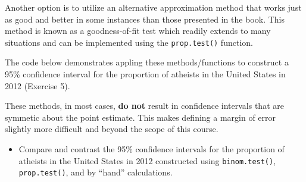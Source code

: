 \documentclass[]{book}
\newenvironment{Shaded}{\begin{snugshade}}{\end{snugshade}}
\newcommand{\KeywordTok}[1]{\textcolor[rgb]{0.13,0.29,0.53}{\textbf{#1}}}
\newcommand{\DataTypeTok}[1]{\textcolor[rgb]{0.13,0.29,0.53}{#1}}
\newcommand{\StringTok}[1]{\textcolor[rgb]{0.31,0.60,0.02}{#1}}
\newcommand{\CommentTok}[1]{\textcolor[rgb]{0.56,0.35,0.01}{\textit{#1}}}
\newcommand{\OperatorTok}[1]{\textcolor[rgb]{0.81,0.36,0.00}{\textbf{#1}}}
\newcommand{\NormalTok}[1]{#1}
\providecommand{\tightlist}{%
  \setlength{\itemsep}{0pt}\setlength{\parskip}{0pt}}
\theoremstyle{definition}
\theoremstyle{definition}
\theoremstyle{definition}
\theoremstyle{remark}
\begin{document}
Another option is to utilize an alternative approximation method that
works just as good and better in some instances than those presented in
the book. This method is known as a goodness-of-fit test which readily
extends to many situations and can be implemented using the
\texttt{prop.test()} function.

The code below demonstrates appling these methods/functions to construct
a 95\% confidence interval for the proportion of atheists in the United
States in 2012 (Exercise 5).

\begin{Shaded}
\end{Shaded}

These methods, in most cases, \textbf{do not} result in confidence
intervals that are symmetic about the point estimate. This makes
defining a margin of error slightly more difficult and beyond the scope
of this course.

\begin{itemize}
\tightlist
\item
  Compare and contrast the 95\% confidence intervals for the proportion
  of atheists in the United States in 2012 constructed using
  \texttt{binom.test()}, \texttt{prop.test()}, and by ``hand''
  calculations.
\end{itemize}
\end{document}
